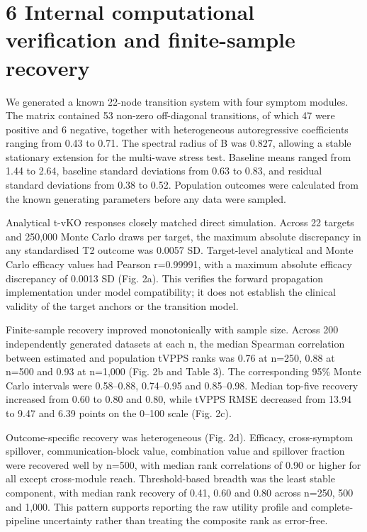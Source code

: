 \documentclass[11pt]{article}
\begin{document}
\section{6 Internal computational verification and finite-sample
recovery}\label{internal-computational-verification-and-finite-sample-recovery}

We generated a known 22-node transition system with four symptom
modules. The matrix contained 53 non-zero off-diagonal transitions, of
which 47 were positive and 6 negative, together with heterogeneous
autoregressive coefficients ranging from 0.43 to 0.71. The spectral
radius of B was 0.827, allowing a stable stationary extension for the
multi-wave stress test. Baseline means ranged from 1.44 to 2.64,
baseline standard deviations from 0.63 to 0.83, and residual standard
deviations from 0.38 to 0.52. Population outcomes were calculated from
the known generating parameters before any data were sampled.

Analytical t-vKO responses closely matched direct simulation. Across 22
targets and 250,000 Monte Carlo draws per target, the maximum absolute
discrepancy in any standardised T2 outcome was 0.0057 SD. Target-level
analytical and Monte Carlo efficacy values had Pearson r=0.99991, with a
maximum absolute efficacy discrepancy of 0.0013 SD (Fig. 2a). This
verifies the forward propagation implementation under model
compatibility; it does not establish the clinical validity of the target
anchors or the transition model.

Finite-sample recovery improved monotonically with sample size. Across
200 independently generated datasets at each n, the median Spearman
correlation between estimated and population tVPPS ranks was 0.76 at
n=250, 0.88 at n=500 and 0.93 at n=1,000 (Fig. 2b and Table 3). The
corresponding 95\% Monte Carlo intervals were 0.58--0.88, 0.74--0.95 and
0.85--0.98. Median top-five recovery increased from 0.60 to 0.80 and
0.80, while tVPPS RMSE decreased from 13.94 to 9.47 and 6.39 points on
the 0--100 scale (Fig. 2c).

Outcome-specific recovery was heterogeneous (Fig. 2d). Efficacy,
cross-symptom spillover, communication-block value, combination value
and spillover fraction were recovered well by n=500, with median rank
correlations of 0.90 or higher for all except cross-module reach.
Threshold-based breadth was the least stable component, with median rank
recovery of 0.41, 0.60 and 0.80 across n=250, 500 and 1,000. This
pattern supports reporting the raw utility profile and complete-pipeline
uncertainty rather than treating the composite rank as error-free.
\end{document}

